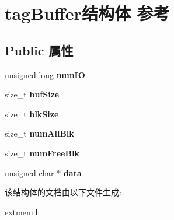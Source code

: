 \hypertarget{structtag_buffer}{}\section{tag\+Buffer结构体 参考}
\label{structtag_buffer}
\subsection*{Public 属性}
\begin{DoxyCompactItemize}
\item 
\mbox{\label{structtag_buffer_afdf12cf65bf2280ad33503ab8071fa5a}} 
unsigned long {\bfseries num\+IO}
\item 
\mbox{\label{structtag_buffer_a926e57e55d681ea965593fbcaa25d130}} 
size\+\_\+t {\bfseries buf\+Size}
\item 
\mbox{\label{structtag_buffer_af9120be862ad9165b4773ae921efc724}} 
size\+\_\+t {\bfseries blk\+Size}
\item 
\mbox{\label{structtag_buffer_ac541d6cedf5a25353ee2038b11fc08e0}} 
size\+\_\+t {\bfseries num\+All\+Blk}
\item 
\mbox{\label{structtag_buffer_a0ebcb3c7f92012654667d7a66309cce8}} 
size\+\_\+t {\bfseries num\+Free\+Blk}
\item 
\mbox{\label{structtag_buffer_a4962759fe549e02c53f07f0565eb75df}} 
unsigned char $\ast$ {\bfseries data}
\end{DoxyCompactItemize}


该结构体的文档由以下文件生成\+:\begin{DoxyCompactItemize}
\item 
extmem.\+h\end{DoxyCompactItemize}

